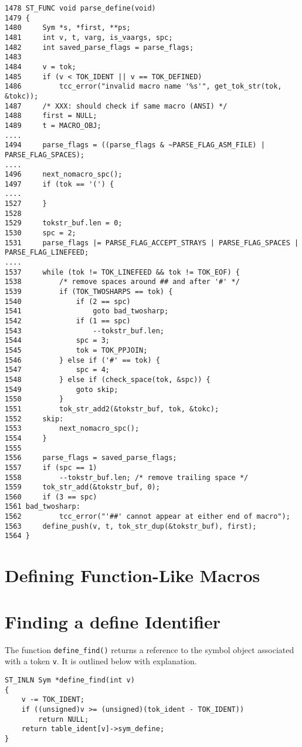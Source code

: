 \begin{verbatim}
1478 ST_FUNC void parse_define(void)
1479 {
1480     Sym *s, *first, **ps;
1481     int v, t, varg, is_vaargs, spc;
1482     int saved_parse_flags = parse_flags;
1483
1484     v = tok;
1485     if (v < TOK_IDENT || v == TOK_DEFINED)
1486         tcc_error("invalid macro name '%s'", get_tok_str(tok, &tokc));
1487     /* XXX: should check if same macro (ANSI) */
1488     first = NULL;
1489     t = MACRO_OBJ;
....    
1494     parse_flags = ((parse_flags & ~PARSE_FLAG_ASM_FILE) | PARSE_FLAG_SPACES);
....    
1496     next_nomacro_spc();
1497     if (tok == '(') {
....
1527     }
1528
1529     tokstr_buf.len = 0;
1530     spc = 2;
1531     parse_flags |= PARSE_FLAG_ACCEPT_STRAYS | PARSE_FLAG_SPACES | PARSE_FLAG_LINEFEED;
....
1537     while (tok != TOK_LINEFEED && tok != TOK_EOF) {
1538         /* remove spaces around ## and after '#' */
1539         if (TOK_TWOSHARPS == tok) {
1540             if (2 == spc)
1541                 goto bad_twosharp;
1542             if (1 == spc)
1543                 --tokstr_buf.len;
1544             spc = 3;
1545             tok = TOK_PPJOIN;
1546         } else if ('#' == tok) {
1547             spc = 4;
1548         } else if (check_space(tok, &spc)) {
1549             goto skip;
1550         }
1551         tok_str_add2(&tokstr_buf, tok, &tokc);
1552     skip:
1553         next_nomacro_spc();
1554     }
1555
1556     parse_flags = saved_parse_flags;
1557     if (spc == 1)
1558         --tokstr_buf.len; /* remove trailing space */
1559     tok_str_add(&tokstr_buf, 0);
1560     if (3 == spc)
1561 bad_twosharp:
1562         tcc_error("'##' cannot appear at either end of macro");
1563     define_push(v, t, tok_str_dup(&tokstr_buf), first);
1564 }
\end{verbatim}



\section{Defining Function-Like Macros}


\section{Finding a define Identifier}

The function \verb|define_find()| returns a reference to the symbol object associated with a token \verb|v|. It is outlined below with explanation.

\begin{verbatim}
ST_INLN Sym *define_find(int v)
{
    v -= TOK_IDENT;
    if ((unsigned)v >= (unsigned)(tok_ident - TOK_IDENT))
        return NULL;
    return table_ident[v]->sym_define;
}
\end{verbatim}

